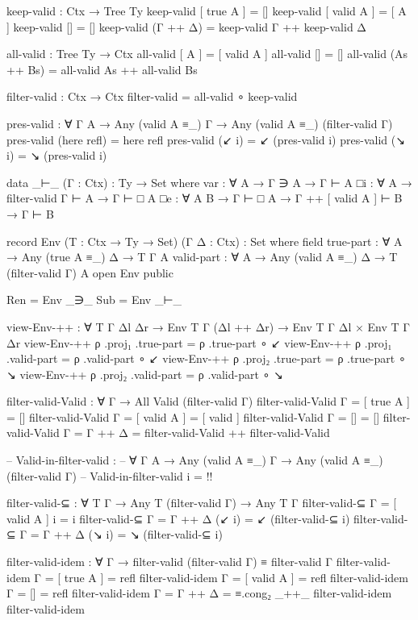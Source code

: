 \begin{code}
  keep-valid : Ctx → Tree Ty
  keep-valid [ true A ] = []
  keep-valid [ valid A ] = [ A ]
  keep-valid [] = []
  keep-valid (Γ ++ Δ) = keep-valid Γ ++ keep-valid Δ

  all-valid : Tree Ty → Ctx
  all-valid [ A ] = [ valid A ]
  all-valid [] = []
  all-valid (As ++ Bs) = all-valid As ++ all-valid Bs

  filter-valid : Ctx → Ctx
  filter-valid = all-valid ∘ keep-valid

  pres-valid : ∀ {Γ A} →
    Any (valid A ≡_) Γ → Any (valid A ≡_) (filter-valid Γ)
  pres-valid (here refl) = here refl
  pres-valid (↙ i) = ↙ (pres-valid i)
  pres-valid (↘ i) = ↘ (pres-valid i)

  data _⊢_ (Γ : Ctx) : Ty → Set where
    var : ∀ {A} → Γ ∋ A → Γ ⊢ A
    □i : ∀ {A} → filter-valid Γ ⊢ A → Γ ⊢ □ A
    □e : ∀ {A B} → Γ ⊢ □ A → Γ ++ [ valid A ] ⊢ B → Γ ⊢ B

  record Env (T : Ctx → Ty → Set) (Γ Δ : Ctx) : Set where
    field
      true-part : ∀ {A} → Any (true A ≡_) Δ → T Γ A
      valid-part : ∀ {A} → Any (valid A ≡_) Δ → T (filter-valid Γ) A
  open Env public

  Ren = Env _∋_
  Sub = Env _⊢_

  view-Env-++ : ∀ {T Γ Δl Δr} → Env T Γ (Δl ++ Δr) → Env T Γ Δl × Env T Γ Δr
  view-Env-++ ρ .proj₁ .true-part = ρ .true-part ∘ ↙
  view-Env-++ ρ .proj₁ .valid-part = ρ .valid-part ∘ ↙
  view-Env-++ ρ .proj₂ .true-part = ρ .true-part ∘ ↘
  view-Env-++ ρ .proj₂ .valid-part = ρ .valid-part ∘ ↘

  filter-valid-Valid : ∀ {Γ} → All Valid (filter-valid Γ)
  filter-valid-Valid {Γ = [ true A ]} = []
  filter-valid-Valid {Γ = [ valid A ]} = [ valid ]
  filter-valid-Valid {Γ = []} = []
  filter-valid-Valid {Γ = Γ ++ Δ} = filter-valid-Valid ++ filter-valid-Valid

  -- Valid-in-filter-valid :
  --   ∀ {Γ A} → Any (valid A ≡_) Γ → Any (valid A ≡_) (filter-valid Γ)
  -- Valid-in-filter-valid i = {!!}

  filter-valid-⊆ : ∀ {T Γ} → Any T (filter-valid Γ) → Any T Γ
  filter-valid-⊆ {Γ = [ valid A ]} i = i
  filter-valid-⊆ {Γ = Γ ++ Δ} (↙ i) = ↙ (filter-valid-⊆ i)
  filter-valid-⊆ {Γ = Γ ++ Δ} (↘ i) = ↘ (filter-valid-⊆ i)

  filter-valid-idem : ∀ {Γ} → filter-valid (filter-valid Γ) ≡ filter-valid Γ
  filter-valid-idem {Γ = [ true A ]} = refl
  filter-valid-idem {Γ = [ valid A ]} = refl
  filter-valid-idem {Γ = []} = refl
  filter-valid-idem {Γ = Γ ++ Δ} =
    ≡.cong₂ _++_ filter-valid-idem filter-valid-idem


\end{code}
